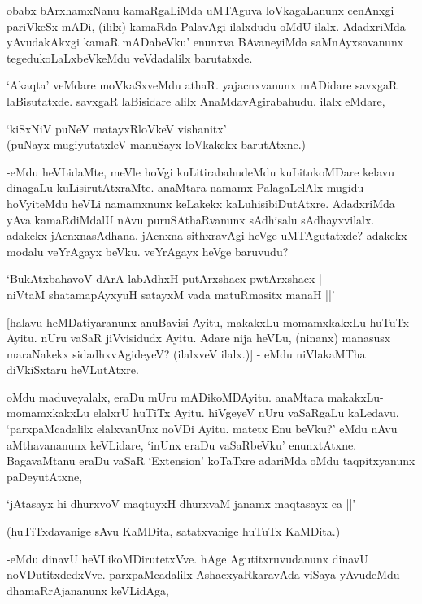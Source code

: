 obabx bArxhamxNanu kamaRgaLiMda uMTAguva loVkagaLanunx cenAnxgi pariVkeSx mADi, (ililx) kamaRda PalavAgi ilalxdudu oMdU ilalx. AdadxriMda yAvudakAkxgi kamaR mADabeVku' enunxva BAvaneyiMda saMnAyxsavanunx tegedukoLaLxbeVkeMdu veVdadalilx barutatxde.

`Akaqta' veMdare moVkaSxveMdu athaR. yajacnxvanunx mADidare savxgaR laBisutatxde. savxgaR laBisidare alilx AnaMdavAgirabahudu. ilalx eMdare,

\begin{shloka}
`kiSxNiV puNeV matayxRloVkeV vishanitx'\\
(puNayx mugiyutatxleV manuSayx loVkakekx barutAtxne.)
\end{shloka}

-eMdu heVLidaMte, meVle hoVgi kuLitirabahudeMdu kuLitukoMDare kelavu dinagaLu kuLisirutAtxraMte. anaMtara namamx PalagaLelAlx mugidu hoVyiteMdu heVLi namamxnunx keLakekx kaLuhisibiDutAtxre. AdadxriMda yAva kamaRdiMdalU nAvu puruSAthaRvanunx sAdhisalu sAdhayxvilalx. adakekx jAcnxnasAdhana. jAcnxna sithxravAgi heVge uMTAgutatxde? adakekx modalu veYrAgayx beVku. veYrAgayx heVge baruvudu?

\begin{shloka}
`BukAtxbahavoV dArA labAdhxH putArxshacx pwtArxshacx |\\
niVtaM shatamapAyxyuH satayxM vada matuRmasitx manaH ||'
\end{shloka}

[halavu heMDatiyaranunx anuBavisi Ayitu, makakxLu-momamxkakxLu huTuTx Ayitu. nUru vaSaR jiVvisidudx Ayitu. Adare nija heVLu, (ninanx) manasusx maraNakekx sidadhxvAgideyeV? (ilalxveV ilalx.)] - eMdu niVlakaMTha diVkiSxtaru heVLutAtxre.

oMdu maduveyalalx, eraDu mUru mADikoMDAyitu. anaMtara makakxLu-momamxkakxLu elalxrU huTiTx Ayitu. hiVgeyeV nUru vaSaRgaLu kaLedavu. `parxpaMcadalilx elalxvanUnx noVDi Ayitu. matetx Enu beVku?' eMdu nAvu aMthavananunx keVLidare, `inUnx eraDu vaSaRbeVku' enunxtAtxne. BagavaMtanu eraDu vaSaR `{\eng Extension}' koTaTxre adariMda oMdu taqpitxyanunx paDeyutAtxne,

\begin{shloka}
`jAtasayx hi dhurxvoV maqtuyxH dhurxvaM janamx maqtasayx ca ||'
\end{shloka}

(huTiTxdavanige sAvu KaMDita, satatxvanige huTuTx KaMDita.)

-eMdu dinavU heVLikoMDirutetxVve. hAge Agutitxruvudanunx dinavU noVDutitxdedxVve. parxpaMcadalilx AshacxyaRkaravAda viSaya yAvudeMdu dhamaRrAjananunx keVLidAga,

